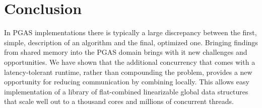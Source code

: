 \section{Conclusion}
In PGAS implementations there is typically a large discrepancy between the first, simple, description of an algorithm and the final, optimized one.
Bringing findings from shared memory into the PGAS domain brings with it new challenges and opportunities.
We have shown that the additional concurrency that comes with a latency-tolerant runtime, rather than compounding the problem, provides a new opportunity for reducing communication by combining locally.
This allows easy implementation of a library of flat-combined linearizable global data structures that scale well out to a thousand cores and millions of concurrent threads.
